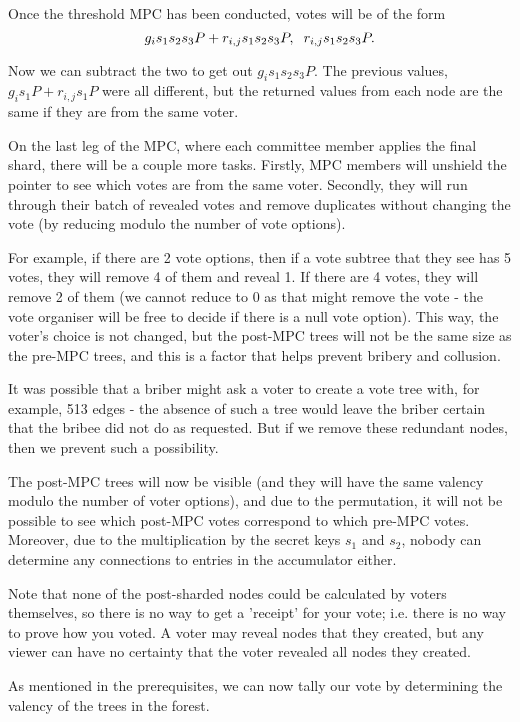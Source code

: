 \documentclass{article}
\begin{document}
Once the threshold MPC has been conducted, votes will be of the form
$$ g_is_1s_2s_3P + r_{i,j}s_1s_2s_3P, \hspace{2mm}r_{i,j}s_1s_2s_3P. $$

Now we can subtract the two to get out $g_is_1s_2s_3P$. The previous values, $g_is_1P + r_{i,j}s_1P$ were all different, but the returned values from each node are the same if they are from the same voter.

On the last leg of the MPC, where each committee member applies the final shard, there will be a couple more tasks. Firstly, MPC members will unshield the pointer to see which votes are from the same voter. Secondly, they will run through their batch of revealed votes and remove duplicates without changing the vote (by reducing modulo the number of vote options).

For example, if there are 2 vote options, then if a vote subtree that they see has 5 votes, they will remove 4 of them and reveal 1. If there are 4 votes, they will remove 2 of them (we cannot reduce to 0 as that might remove the vote - the vote organiser will be free to decide if there is a null vote option). This way, the voter's choice is not changed, but the post-MPC trees will not be the same size as the pre-MPC trees, and this is a factor that helps prevent bribery and collusion.

It was possible that a briber might ask a voter to create a vote tree with, for example, 513 edges - the absence of such a tree would leave the briber certain that the bribee did not do as requested. But if we remove these redundant nodes, then we prevent such a possibility.

The post-MPC trees will now be visible (and they will have the same valency modulo the number of voter options), and due to the permutation, it will not be possible to see which post-MPC votes correspond to which pre-MPC votes. Moreover, due to the multiplication by the secret keys $s_1$ and $s_2$, nobody can determine any connections to entries in the accumulator either.

Note that none of the post-sharded nodes could be calculated by voters themselves, so there is no way to get a 'receipt' for your vote; i.e. there is no way to prove how you voted. A voter may reveal nodes that they created, but any viewer can have no certainty that the voter revealed all nodes they created.

As mentioned in the prerequisites, we can now tally our vote by determining the valency of the trees in the forest.
\end{document}
